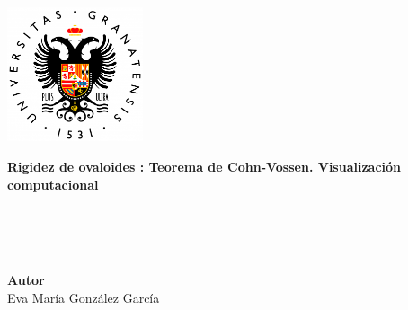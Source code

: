 \begin{titlepage}
 
 
\setlength{\centeroffset}{-0.5\oddsidemargin}
\addtolength{\centeroffset}{0.5\evensidemargin}
\thispagestyle{empty}

\noindent\hspace*{\centeroffset}\begin{minipage}{\textwidth}

\centering

% 

 \vspace{3.3cm}

\includegraphics[width=0.3\textwidth]{imagenes/logougr_new.png}\\[1.4cm]

 \vspace{0.5cm}


{\Huge\bfseries Rigidez de ovaloides : Teorema de Cohn-Vossen. Visualización computacional\\
}
\end{minipage}
${ }$\\
${ }$\\
${ }$\\

\vspace{2.5cm}
\noindent\hspace*{\centeroffset}\begin{minipage}{\textwidth}
\centering

\textbf{Autor}\\ {Eva María González García}\\[2.5ex]


\end{minipage}
\end{titlepage}
